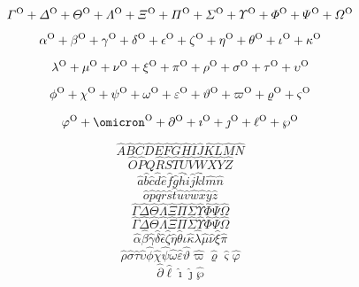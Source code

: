 $$
\varGamma^{\rm O}+
\varDelta^{\rm O}+
\varTheta^{\rm O}+
\varLambda^{\rm O}+
\varXi^{\rm O}+
\varPi^{\rm O}+
\varSigma^{\rm O}+
\varUpsilon^{\rm O}+
\varPhi^{\rm O}+
\varPsi^{\rm O}+
\varOmega^{\rm O}
$$

$$
\alpha^{\rm O}+
\beta^{\rm O}+
\gamma^{\rm O}+
\delta^{\rm O}+
\epsilon^{\rm O}+
\zeta^{\rm O}+
\eta^{\rm O}+
\theta^{\rm O}+
\iota^{\rm O}+
\kappa^{\rm O}
$$

$$
\lambda^{\rm O}+
\mu^{\rm O}+
\nu^{\rm O}+
\xi^{\rm O}+
\pi^{\rm O}+
\rho^{\rm O}+
\sigma^{\rm O}+
\tau^{\rm O}+
\upsilon^{\rm O}
$$

$$
\phi^{\rm O}+
\chi^{\rm O}+
\psi^{\rm O}+
\omega^{\rm O}+
\varepsilon^{\rm O}+
\vartheta^{\rm O}+
\varpi^{\rm O}+
\varrho^{\rm O}+
\varsigma^{\rm O}
$$

$$
\varphi^{\rm O}+
\omicron^{\rm O}+
\partial^{\rm O}+
\imath^{\rm O}+
\jmath^{\rm O}+
\ell^{\rm O}+
\wp^{\rm O}
$$





$$
\hat{A} \hat{B} \hat{C} \hat{D} \hat{E} \hat{F} \hat{G} \hat{H} 
\hat{I} \hat{J} \hat{K} \hat{L} \hat{M} \hat{N}
$$
%
$$
\hat{O} \hat{P} \hat{Q} \hat{R} \hat{S} \hat{T} \hat{U} \hat{V} 
\hat{W} \hat{X} \hat{Y} \hat{Z}
$$
%
$$
\hat{a} \hat{b} \hat{c} \hat{d} \hat{e} \hat{f} \hat{g} \hat{h} 
\hat{i} \hat{j} \hat{k} \hat{l} \hat{m} \hat{n}
$$
%
$$
\hat{o} \hat{p} \hat{q} \hat{r} \hat{s} \hat{t} \hat{u} \hat{v} 
\hat{w} \hat{x} \hat{y} \hat{z} 
$$
%
%
%
$$
\hat{\Gamma} \hat{\Delta} \hat{\Theta} \hat{\Lambda} \hat{\Xi} \hat{\Pi} 
\hat{\Sigma} \hat{\Upsilon} \hat{\Phi} \hat{\Psi} \hat{\Omega} 
$$
%
$$
\hat{\varGamma} \hat{\varDelta} \hat{\varTheta} \hat{\varLambda} \hat{\varXi} \hat{\varPi} 
\hat{\varSigma} \hat{\varUpsilon} \hat{\varPhi} \hat{\varPsi} \hat{\varOmega} 
$$
%
$$
\hat{\alpha} \hat{\beta} \hat{\gamma} \hat{\delta} \hat{\epsilon} \hat{\zeta} 
\hat{\eta} \hat{\theta} \hat{\iota} \hat{\kappa} \hat{\lambda} \hat{\mu} \hat{\nu} 
\hat{\xi} \hat{\pi}
$$
%
$$
\hat{\rho} \hat{\sigma} \hat{\tau} \hat{\upsilon} \hat{\phi} 
\hat{\chi} \hat{\psi} \hat{\omega} \hat{\varepsilon} \hat{\vartheta} \hat{\varpi} 
\hat{\varrho} \hat{\varsigma} \hat{\varphi} 
$$
%
$$
\hat{\partial} \hat{\ell} \hat{\imath} \hat{\jmath} \hat{\wp} 
$$


